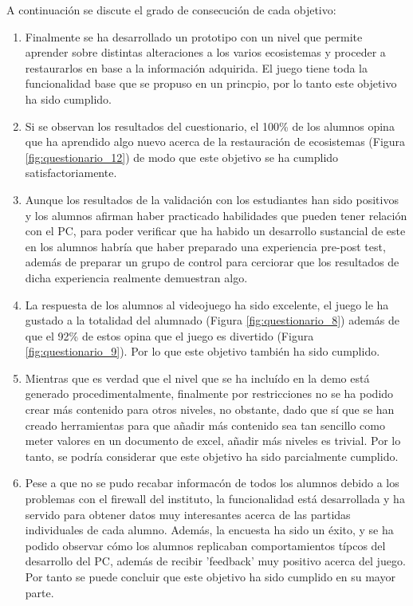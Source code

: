 A continuación se discute el grado de consecución de cada objetivo:
\begin{enumerate}[itemsep=0mm]

\item Finalmente se ha desarrollado un prototipo con un nivel que permite aprender sobre distintas alteraciones a los varios ecosistemas
 y proceder a restaurarlos en base a la información adquirida. El juego tiene toda la funcionalidad base que se propuso en un princpio,
  por lo tanto este objetivo ha sido cumplido.
  
\item Si se observan los resultados del cuestionario, el 100\% de los alumnos opina que ha aprendido algo nuevo acerca de la restauración de ecosistemas
(Figura \ref{fig:questionario_12}) de modo que este objetivo se ha cumplido satisfactoriamente.

\item Aunque los resultados de la validación con los estudiantes han sido positivos y los alumnos afirman haber practicado habilidades que pueden tener relación con el PC, 
para poder verificar que ha habido un desarrollo sustancial de este en los alumnos habría que haber preparado una experiencia pre-post test,
además de preparar un grupo de control para cerciorar que los resultados de dicha experiencia realmente demuestran algo. 

\item La respuesta de los alumnos al videojuego ha sido excelente, el juego le ha gustado a la totalidad del alumnado (Figura \ref{fig:questionario_8}) 
además de que el 92\% de estos opina que el juego es divertido (Figura \ref{fig:questionario_9}). Por lo que este objetivo también ha sido cumplido.

\item Mientras que es verdad que el nivel que se ha incluído en la demo está generado procedimentalmente, finalmente por restricciones no se ha podido
 crear más contenido para otros niveles, no obstante, dado que sí que se han creado herramientas para que añadir más contenido sea tan sencillo como 
 meter valores en un documento de excel, añadir más niveles es trivial. Por lo tanto, se podría considerar que este objetivo ha sido parcialmente cumplido. 

\item Pese a que no se pudo recabar informacón de todos los alumnos debido a los problemas con el firewall del instituto, la funcionalidad está desarrollada y
 ha servido para obtener datos muy interesantes acerca de las partidas individuales de cada alumno. Además, la encuesta ha sido un éxito, y se ha podido
  observar cómo los alumnos replicaban comportamientos típcos del desarrollo del PC, además de recibir 'feedback' muy positivo acerca del juego.
   Por tanto se puede concluir que este objetivo ha sido cumplido en su mayor parte.
\end{enumerate}


